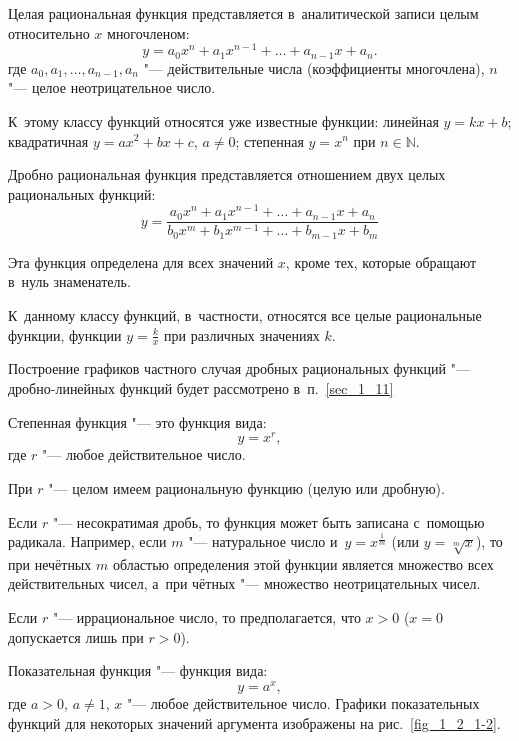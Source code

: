 Целая рациональная функция представляется в~аналитической записи целым
относительно $x$ многочленом:
\begin{equation*}
y = a_{0}x^{n} + a_{1}x^{n-1} + \ldots + a_{n-1}x + a_{n} .
\end{equation*}
где $a_{0}, a_{1}, \dots, a_{n-1}, a_{n}$ "--- действительные числа
(коэффициенты многочлена),
$n$ "--- целое неотрицательное число.

К~этому классу функций относятся уже известные функции:
линейная $y = kx + b$;
квадратичная $y = ax^{2} + bx + c$, $a \ne 0$;
степенная $y = x^{n}$ при $n \in \mathbb{N}$.

Дробно рациональная функция представляется отношением двух целых рациональных
функций:
\begin{equation*}
y = 
\frac
{a_{0}x^{n} + a_{1}x^{n-1} + \ldots + a_{n-1}x + a_{n}}
{b_{0}x^{m} + b_{1}x^{m-1} + \ldots + b_{m-1}x + b_{m}}
\end{equation*}

Эта функция определена для всех значений $x$, кроме тех,
которые обращают в~нуль знаменатель.

К~данному классу функций, в~частности, относятся все целые рациональные функции,
функции $\displaystyle y = \frac{k}{x}$ при различных значениях $k$.

Построение графиков частного случая дробных рациональных функций "---
дробно-линейных функций будет рассмотрено в~п.\ \ref{sec_1_11}

Степенная функция "--- это функция вида:
\begin{equation*}
y = x^{r},
\end{equation*}
где $r$ "--- любое действительное число.

При $r$ "--- целом имеем рациональную функцию (целую или дробную).

Если $r$ "--- несократимая дробь, то функция может быть записана с~помощью радикала.
Например, если $m$ "--- натуральное число и~$\displaystyle y = x^{\frac{1}{m}}$
(или $y = \sqrt[m]{x}$), то при нечётных $m$ областью определения этой функции
является множество всех действительных чисел, а~при чётных "--- множество
неотрицательных чисел.

Если $r$ "--- иррациональное число, то предполагается, что $x>0$
($x=0$ допускается лишь при $r>0$).

Показательная функция "--- функция вида:
\begin{equation*}
y = a^{x},
\end{equation*}
где $a>0$, $a \ne 1$, $x$ "--- любое действительное число.
Графики показательных функций для некоторых значений аргумента изображены
на рис.\ \ref{fig_1_2_1-2}.

